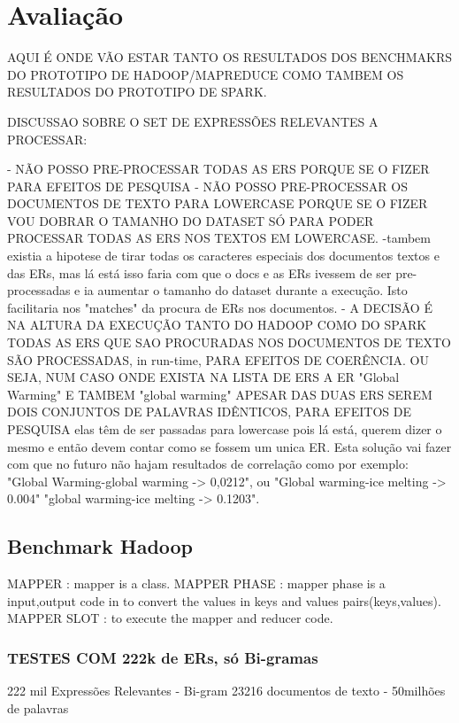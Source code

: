 \chapter{Avaliação}
\label{cha:avaliacao}
AQUI É ONDE VÃO ESTAR TANTO OS RESULTADOS DOS BENCHMAKRS DO PROTOTIPO DE HADOOP/MAPREDUCE COMO TAMBEM OS RESULTADOS DO PROTOTIPO DE SPARK.

DISCUSSAO SOBRE O SET DE EXPRESSÕES RELEVANTES A PROCESSAR:

    - NÃO POSSO PRE-PROCESSAR TODAS AS ERS PORQUE SE O FIZER PARA EFEITOS DE PESQUISA 
    - NÃO POSSO PRE-PROCESSAR OS DOCUMENTOS DE TEXTO PARA LOWERCASE PORQUE SE O FIZER VOU DOBRAR O TAMANHO DO DATASET SÓ PARA PODER PROCESSAR TODAS AS ERS NOS TEXTOS EM LOWERCASE.
    -tambem existia a hipotese de tirar todas os caracteres especiais dos documentos textos e das ERs, mas lá está isso faria com que o docs e as ERs ivessem de ser pre-processadas e ia aumentar o tamanho do dataset durante a execução. Isto facilitaria nos "matches" da procura de ERs nos documentos. 
    - A DECISÃO É NA ALTURA DA EXECUÇÃO TANTO DO HADOOP COMO DO SPARK TODAS AS ERS QUE SAO PROCURADAS NOS DOCUMENTOS DE TEXTO SÃO PROCESSADAS, in run-time, PARA EFEITOS DE COERÊNCIA. OU SEJA, NUM CASO ONDE EXISTA NA LISTA DE ERS A ER "Global Warming" E TAMBEM "global warming" APESAR DAS DUAS ERS SEREM DOIS CONJUNTOS DE PALAVRAS IDÊNTICOS, PARA EFEITOS DE PESQUISA elas têm de ser passadas para lowercase pois lá está, querem dizer o mesmo e então devem contar como se fossem um unica ER. Esta solução vai fazer com que no futuro não hajam resultados de correlação como por exemplo: "Global Warming-global warming -> 0,0212", ou "Global warming-ice melting -> 0.004" "global warming-ice melting -> 0.1203".
    

\section{Benchmark Hadoop}
MAPPER : mapper is a class. MAPPER PHASE : mapper phase is a input,output code in to convert the values in keys and values pairs(keys,values). MAPPER SLOT : to execute the mapper and reducer code.
    
    
\subsection{TESTES COM 222k de ERs, só Bi-gramas}
222 mil Expressões Relevantes - Bi-gram
23216 documentos de texto - 50milhões de palavras

